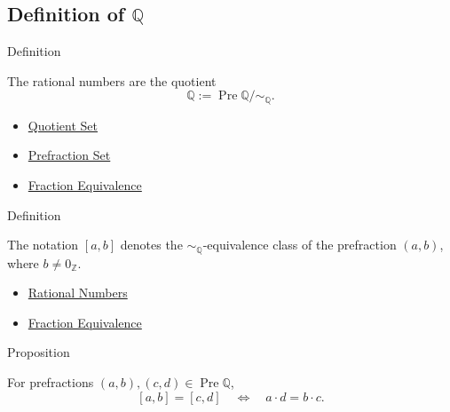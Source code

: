 \subsection*{\texorpdfstring{Definition of $\mathbb{Q}$}{Definition of Q}}

\begin{definitionbox}{Definition}
\begin{definition}
\label{def:rationals}
The rational numbers are the quotient
\[
\mathbb{Q}:=\operatorname{Pre}\mathbb{Q}/{\sim_{\mathbb{Q}}}.
\]
\end{definition}
\end{definitionbox}

\begin{dependencies}
\begin{itemize}
  \item \hyperref[def:quotient-set]{Quotient Set}
  \item \hyperref[def:prefraction-set]{Prefraction Set}
  \item \hyperref[def:fraction-equivalence]{Fraction Equivalence}
\end{itemize}
\end{dependencies}

\begin{definitionbox}{Definition}
\begin{definition}
\label{def:rational-class-notation}
The notation $[a,b]$ denotes the $\sim_{\mathbb{Q}}$-equivalence class of the
prefraction $(a,b)$, where $b\ne 0_{\mathbb{Z}}$.
\end{definition}
\end{definitionbox}

\begin{dependencies}
\begin{itemize}
  \item \hyperref[def:rationals]{Rational Numbers}
  \item \hyperref[def:fraction-equivalence]{Fraction Equivalence}
\end{itemize}
\end{dependencies}

\begin{propositionbox}{Proposition}
\begin{proposition}
\label{prop:equality-criterion-for-rational-classes}
For prefractions $(a,b),(c,d)\in\operatorname{Pre}\mathbb{Q}$,
\[
[a,b]=[c,d]
\quad\Longleftrightarrow\quad
a\cdot d=b\cdot c.
\]
\end{proposition}
\end{propositionbox}

